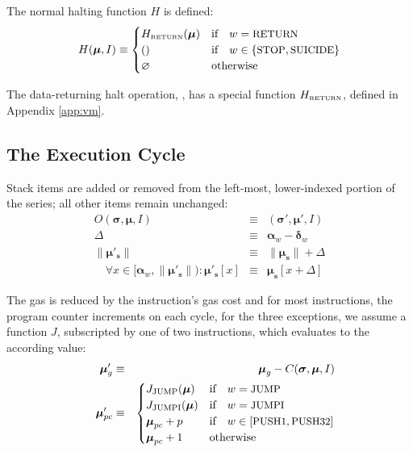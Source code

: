 \documentclass[9pt,oneside]{amsart}
\begin{document}
\begin{multicols}{2}
The normal halting function $H$ is defined:
\begin{equation}
H(\boldsymbol{\mu}, I) \equiv \begin{cases}
H_{\text{\tiny RETURN}}(\boldsymbol{\mu}) & \text{if} \quad w = \text{\small RETURN} \\
() & \text{if} \quad w \in \{ \text{\small STOP}, \text{\small SUICIDE} \} \\
\varnothing & \text{otherwise}
\end{cases}
\end{equation}

The data-returning halt operation, , has a special function $H_{\text{\tiny RETURN}}$, defined in Appendix \ref{app:vm}.

\subsection{The Execution Cycle}

Stack items are added or removed from the left-most, lower-indexed portion of the series; all other items remain unchanged:
\begin{eqnarray}
O(\boldsymbol{\sigma}, \boldsymbol{\mu}, I) & \equiv & (\boldsymbol{\sigma}', \boldsymbol{\mu}', I) \\
\Delta & \equiv & \mathbf{\alpha}_w - \mathbf{\delta}_w \\
\lVert\boldsymbol{\mu}'_\mathbf{s}\rVert & \equiv & \lVert\boldsymbol{\mu}_\mathbf{s}\rVert + \Delta \\
\quad \forall x \in [\mathbf{\alpha}_w, \lVert\boldsymbol{\mu}'_\mathbf{s}\rVert): \boldsymbol{\mu}'_\mathbf{s}[x] & \equiv & \boldsymbol{\mu}_\mathbf{s}[x+\Delta]
\end{eqnarray}

The gas is reduced by the instruction's gas cost and for most instructions, the program counter increments on each cycle, for the three exceptions, we assume a function $J$, subscripted by one of two instructions, which evaluates to the according value:
\begin{eqnarray}
\quad \boldsymbol{\mu}'_{g} & \equiv & \boldsymbol{\mu}_{g} - C(\boldsymbol{\sigma}, \boldsymbol{\mu}, I) \\
\quad \boldsymbol{\mu}'_{pc} & \equiv & \begin{cases}
J_{\text{JUMP}}(\boldsymbol{\mu}) & \text{if} \quad w = \text{\small JUMP} \\
J_{\text{JUMPI}}(\boldsymbol{\mu}) & \text{if} \quad w = \text{\small JUMPI} \\
\boldsymbol{\mu}_{pc} + p & \text{if} \quad w \in [\text{\small PUSH1}, \text{\small PUSH32}] \\
\boldsymbol{\mu}_{pc} + 1 & \text{otherwise}
\end{cases}
\end{eqnarray}


\end{multicols}
\end{document}
